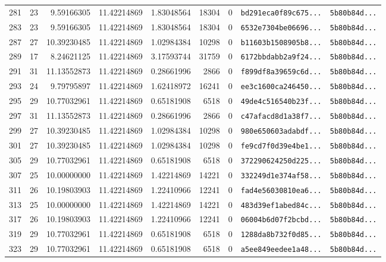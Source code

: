 \documentclass[10pt]{article}
\begin{document}
\begin{longtable}{rrrrrrrll}
  281 & 23 & 9.59166305 & 11.42214869 & 1.83048564 & 18304 & 0 & \texttt{bd291eca0f89c675...} & \texttt{5b80b84d...} \\
  283 & 23 & 9.59166305 & 11.42214869 & 1.83048564 & 18304 & 0 & \texttt{6532e7304be06696...} & \texttt{5b80b84d...} \\
  287 & 27 & 10.39230485 & 11.42214869 & 1.02984384 & 10298 & 0 & \texttt{b11603b1508905b8...} & \texttt{5b80b84d...} \\
  289 & 17 & 8.24621125 & 11.42214869 & 3.17593744 & 31759 & 0 & \texttt{6172bbdabb2a9f24...} & \texttt{5b80b84d...} \\
  291 & 31 & 11.13552873 & 11.42214869 & 0.28661996 & 2866 & 0 & \texttt{f899df8a39659c6d...} & \texttt{5b80b84d...} \\
  293 & 24 & 9.79795897 & 11.42214869 & 1.62418972 & 16241 & 0 & \texttt{ee3c1600ca246450...} & \texttt{5b80b84d...} \\
  295 & 29 & 10.77032961 & 11.42214869 & 0.65181908 & 6518 & 0 & \texttt{49de4c516540b23f...} & \texttt{5b80b84d...} \\
  297 & 31 & 11.13552873 & 11.42214869 & 0.28661996 & 2866 & 0 & \texttt{c47afacd8d1a38f7...} & \texttt{5b80b84d...} \\
  299 & 27 & 10.39230485 & 11.42214869 & 1.02984384 & 10298 & 0 & \texttt{980e650603adabdf...} & \texttt{5b80b84d...} \\
  301 & 27 & 10.39230485 & 11.42214869 & 1.02984384 & 10298 & 0 & \texttt{fe9cd7f0d39e4be1...} & \texttt{5b80b84d...} \\
  305 & 29 & 10.77032961 & 11.42214869 & 0.65181908 & 6518 & 0 & \texttt{372290624250d225...} & \texttt{5b80b84d...} \\
  307 & 25 & 10.00000000 & 11.42214869 & 1.42214869 & 14221 & 0 & \texttt{332249d1e374af58...} & \texttt{5b80b84d...} \\
  311 & 26 & 10.19803903 & 11.42214869 & 1.22410966 & 12241 & 0 & \texttt{fad4e56030810ea6...} & \texttt{5b80b84d...} \\
  313 & 25 & 10.00000000 & 11.42214869 & 1.42214869 & 14221 & 0 & \texttt{483d39ef1abed84c...} & \texttt{5b80b84d...} \\
  317 & 26 & 10.19803903 & 11.42214869 & 1.22410966 & 12241 & 0 & \texttt{06004b6d07f2bcbd...} & \texttt{5b80b84d...} \\
  319 & 29 & 10.77032961 & 11.42214869 & 0.65181908 & 6518 & 0 & \texttt{1288da8b732f0d85...} & \texttt{5b80b84d...} \\
  323 & 29 & 10.77032961 & 11.42214869 & 0.65181908 & 6518 & 0 & \texttt{a5ee849eedee1a48...} & \texttt{5b80b84d...} \\

\end{longtable}
\end{document}
